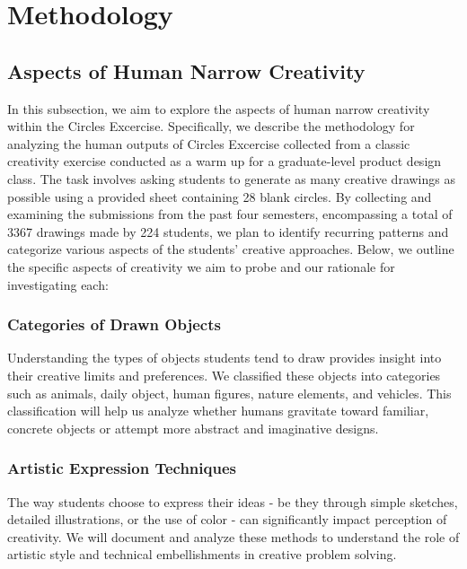\section{Methodology}

\subsection{Aspects of Human Narrow Creativity}

In this subsection, we aim to explore the aspects of human narrow creativity within the Circles Excercise. 
Specifically, we describe the methodology for analyzing the human outputs of Circles Excercise collected from a classic creativity exercise conducted as a warm up for a graduate-level product design class. 
The task involves asking students to generate as many creative drawings as possible using a provided sheet containing 28 blank circles. By collecting and examining the submissions from the past four semesters, encompassing a total of 3367 drawings made by 224 students, we plan to identify recurring patterns and categorize various aspects of the students’ creative approaches. Below, we outline the specific aspects of creativity we aim to probe and our rationale for investigating each:


\subsubsection{Categories of Drawn Objects}
Understanding the types of objects students tend to draw provides insight into their creative limits and preferences. We classified these objects into categories such as animals, daily object, human figures, nature elements, and vehicles. This classification will help us analyze whether humans gravitate toward familiar, concrete objects or attempt more abstract and imaginative designs. 

\subsubsection{Artistic Expression Techniques}
The way students choose to express their ideas - be they through simple sketches, detailed illustrations, or the use of color - can significantly impact perception of creativity. We will document and analyze these methods to understand the role of artistic style and technical embellishments in creative problem solving.

